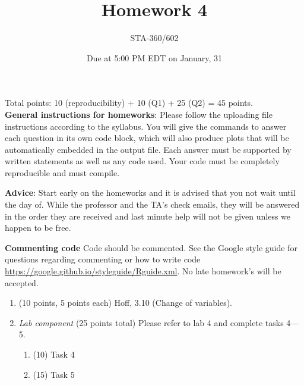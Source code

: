 \documentclass{article}
\begin{document}
\title{Homework 4}
\author{STA-360/602}
\date{Due at 5:00 PM EDT on January, 31}
\maketitle

Total points: 10 (reproducibility) + 10 (Q1) + 25 (Q2) = 45 points. \\

\textbf{General instructions for homeworks}: Please follow the uploading file instructions according to the syllabus. You will give the commands to answer each question in its own code block, which will also produce plots that will be automatically embedded in the output file. Each answer must be supported by written statements as well as any code used. Your code must be completely reproducible and must compile. 

\textbf{Advice}: Start early on the homeworks and it is advised that you not wait until the day of. While the professor and the TA's check emails, they will be answered in the order they are received and last minute help will not be given unless we happen to be free.  

\textbf{Commenting code}
Code should be commented. See the Google style guide for questions regarding commenting or how to write 
code \url{https://google.github.io/styleguide/Rguide.xml}. No late homework's will be accepted.


\begin{enumerate}
\item (10 points, 5 points each) Hoff, 3.10 (Change of variables). 


\item {\em Lab component} 
  (25 points total) Please refer to lab 4 and complete tasks 4---5. 
  \begin{enumerate}
  \item (10) Task 4
  \item (15) Task 5
  \end{enumerate}
  
\end{enumerate}
\end{document}

